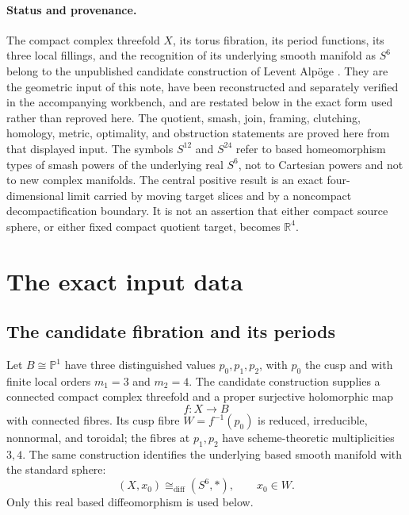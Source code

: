 \documentclass[11pt,letterpaper]{article}
\numberwithin{equation}{section}
\theoremstyle{definition}
\theoremstyle{remark}
\newcommand{\R}{\mathbb R}
\begin{document}
\paragraph{Status and provenance.}
The compact complex threefold $X$, its torus fibration, its period functions,
its three local fillings, and the recognition of its underlying smooth
manifold as $S^6$ belong to the unpublished candidate construction of
Levent Alp\"oge \citep{AlpogeS6_2026}.  They are the geometric input of this
note, have been reconstructed and separately verified in the accompanying
workbench, and are restated below in the exact form used rather than reproved
here.  The quotient, smash, join, framing, clutching,
homology, metric, optimality, and obstruction statements are proved here
from that displayed input.  The symbols \(S^{12}\) and \(S^{24}\) refer
to based homeomorphism types of smash powers of the underlying real
\(S^6\), not to Cartesian powers and not to new complex manifolds.  The
central positive result is an exact four-dimensional limit carried by
moving target slices and by a noncompact decompactification boundary.  It
is not an assertion that either compact source sphere, or either fixed
compact quotient target, becomes \(\R^4\).

\section{The exact input data}

\subsection{The candidate fibration and its periods}

Let $B\cong\mathbb P^1$ have three distinguished values
$p_0,p_1,p_2$, with $p_0$ the cusp and with finite local orders
$m_1=3$ and $m_2=4$.  The candidate construction supplies a connected
compact complex threefold and a proper surjective holomorphic map
\begin{equation}
 f:X\longrightarrow B
 \label{eq:fibration}
\end{equation}
with connected fibres.  Its cusp fibre $W=f^{-1}(p_0)$ is reduced,
irreducible, nonnormal, and toroidal; the fibres at $p_1,p_2$ have
scheme-theoretic multiplicities $3,4$.  The same construction identifies
the underlying based smooth manifold with the standard sphere:
\begin{equation}
 (X,x_0)\cong_{\mathrm{diff}}(S^6,*),\qquad x_0\in W.
 \label{eq:source-sphere}
\end{equation}
Only this real based diffeomorphism is used below.
\end{document}

